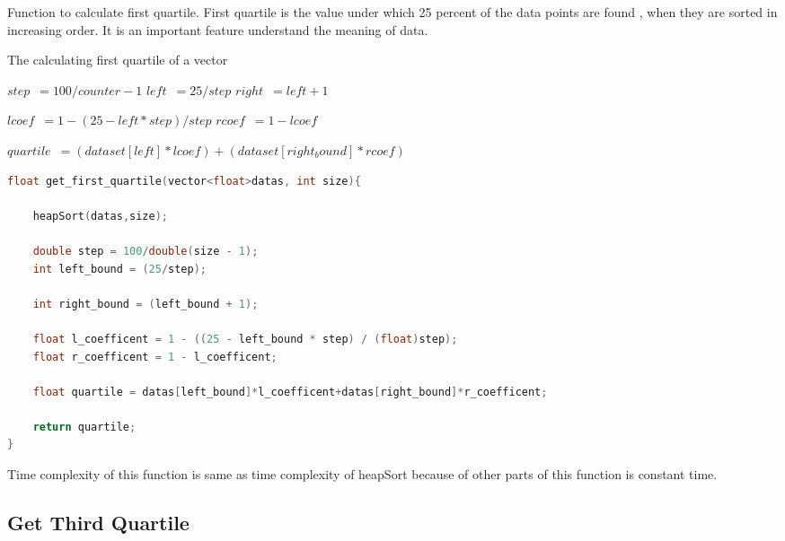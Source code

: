 \documentclass[a4paper, 12pt, titlepage]{article}
\begin{document}
    Function to calculate first quartile. First quartile is the value under which 25 percent of the data points are found , when they are sorted in increasing order. It is an important feature understand the meaning of data. 
\begin{algorithm}[H]
	\caption{The calculating first quartile of a vector}
	\label{algo:dfs}
	\begin{algorithmic}

		
            \State{}

            \State $step$\ {$ = 100/counter-1$} 
            \State $left$\ {$ = 25/step$}
            \State $right$\ {$ = left + 1$}

            \State $lcoef$\ {$ = 1 - (25 - left * step) / step$} 
            \State $rcoef$\ {$ = 1 - lcoef$} 

            \State $quartile$\ {$ = (dataset[left] * lcoef) + (dataset[right_bound] * rcoef)$} 

	\EndFunction
	\end{algorithmic}
\end{algorithm}
    
\usepackage{\textbf{Code for Get First Quartile}}
\begin{lstlisting}[language=C++]
float get_first_quartile(vector<float>datas, int size){    

    heapSort(datas,size);                                 

    double step = 100/double(size - 1);                     
    int left_bound = (25/step);                             

    int right_bound = (left_bound + 1);                    

    float l_coefficent = 1 - ((25 - left_bound * step) / (float)step);     
    float r_coefficent = 1 - l_coefficent;                                 

    float quartile = datas[left_bound]*l_coefficent+datas[right_bound]*r_coefficent;  

    return quartile;
}
\end{lstlisting}
Time complexity of this function is same as time complexity of heapSort because of other parts of this function is constant time.

\newpage

\subsection{Get Third Quartile}
\end{document}
